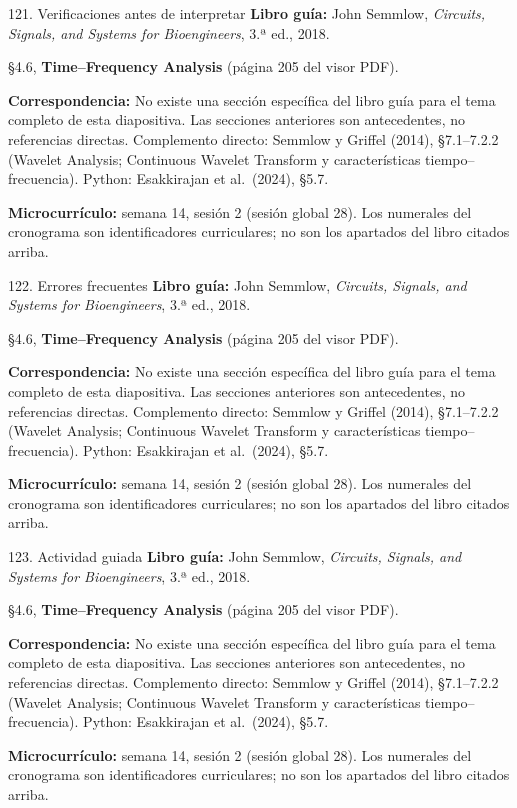 \documentclass[
  10pt,
  ignorenonframetext,
  aspectratio=169,
  spanish,
]{beamer}
\begin{document}
\begin{frame}{121. Verificaciones antes de interpretar}
\label{verificaciones-antes-de-interpretar-7}
\textbf{Libro guía:} John Semmlow, \emph{Circuits, Signals, and Systems
for Bioengineers}, 3.ª ed., 2018.

§4.6, \textbf{Time--Frequency Analysis} (página 205 del visor PDF).

\textbf{Correspondencia:} No existe una sección específica del libro
guía para el tema completo de esta diapositiva. Las secciones anteriores
son antecedentes, no referencias directas. Complemento directo: Semmlow
y Griffel (2014), §7.1--7.2.2 (Wavelet Analysis; Continuous Wavelet
Transform y características tiempo--frecuencia). Python: Esakkirajan et
al.~(2024), §5.7.

\textbf{Microcurrículo:} semana 14, sesión 2 (sesión global 28). Los
numerales del cronograma son identificadores curriculares; no son los
apartados del libro citados arriba.
\end{frame}

\begin{frame}{122. Errores frecuentes}
\label{errores-frecuentes-7}
\textbf{Libro guía:} John Semmlow, \emph{Circuits, Signals, and Systems
for Bioengineers}, 3.ª ed., 2018.

§4.6, \textbf{Time--Frequency Analysis} (página 205 del visor PDF).

\textbf{Correspondencia:} No existe una sección específica del libro
guía para el tema completo de esta diapositiva. Las secciones anteriores
son antecedentes, no referencias directas. Complemento directo: Semmlow
y Griffel (2014), §7.1--7.2.2 (Wavelet Analysis; Continuous Wavelet
Transform y características tiempo--frecuencia). Python: Esakkirajan et
al.~(2024), §5.7.

\textbf{Microcurrículo:} semana 14, sesión 2 (sesión global 28). Los
numerales del cronograma son identificadores curriculares; no son los
apartados del libro citados arriba.
\end{frame}

\begin{frame}{123. Actividad guiada}
\label{actividad-guiada-7}
\textbf{Libro guía:} John Semmlow, \emph{Circuits, Signals, and Systems
for Bioengineers}, 3.ª ed., 2018.

§4.6, \textbf{Time--Frequency Analysis} (página 205 del visor PDF).

\textbf{Correspondencia:} No existe una sección específica del libro
guía para el tema completo de esta diapositiva. Las secciones anteriores
son antecedentes, no referencias directas. Complemento directo: Semmlow
y Griffel (2014), §7.1--7.2.2 (Wavelet Analysis; Continuous Wavelet
Transform y características tiempo--frecuencia). Python: Esakkirajan et
al.~(2024), §5.7.

\textbf{Microcurrículo:} semana 14, sesión 2 (sesión global 28). Los
numerales del cronograma son identificadores curriculares; no son los
apartados del libro citados arriba.
\end{frame}
\end{document}
